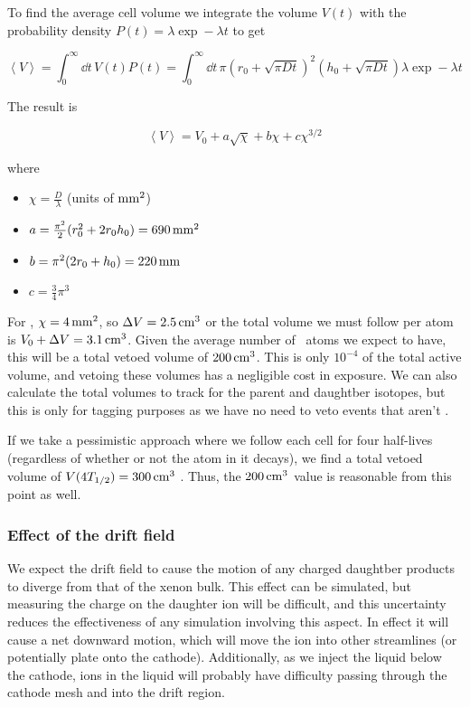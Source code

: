 To find the average cell volume we integrate the volume $V(t)$ with the probability density $P(t) = \lambda \exp -\lambda t$ to get

\begin{equation}
\left< V \right> = \int_0^{\infty} \dd t\,V(t) P(t) = \int_0^{\infty} \dd t\,\pi(r_0 + \sqrt{\pi Dt})^2(h_0 + \sqrt{\pi Dt})\lambda\exp -\lambda t
\end{equation}

The result is

\begin{equation}
\left< V \right> = V_0 + a\sqrt{\chi} + b\chi + c\chi^{3/2}
\end{equation}

where
\begin{itemize}
    \item $\chi = \frac{D}{\lambda}$ (units of $\mathrm{mm^2}$)
    \item $a = \frac{\pi^{2}}{2} (r_0^2+2 r_0 h_0) = 690\,\mathrm{mm^2}$
    \item $b = \pi^2 (2r_0 + h_0) = 220\,\mathrm{mm}$
    \item $c = \frac{3}{4} \pi^{3}$
\end{itemize}

For \Pb, $\chi = 4\,\mathrm{mm^2}$, so $\Delta V = 2.5\,\mathrm{cm^3}$ or the total volume we must follow per atom is $V_0 + \Delta V = 3.1\,\mathrm{cm^3}$. Given the average number of \Pb~atoms we expect to have, this will be a total vetoed volume of $200\,\mathrm{cm^3}$. This is only $10^{-4}$ of the total active volume, and vetoing these volumes has a negligible cost in exposure. We can also calculate the total volumes to track for the parent and daughtber isotopes, but this is only for tagging purposes as we have no need to veto events that aren't \Pb.

If we take a pessimistic approach where we follow each cell for four half-lives (regardless of whether or not the atom in it decays), we find a total vetoed volume of $V(4T_{1/2}) = 300\,\mathrm{cm^3}$ . Thus, the $200\,\mathrm{cm^3}$ value is reasonable from this point as well.

\subsubsection{Effect of the drift field}

We expect the drift field to cause the motion of any charged daughtber products to diverge from that of the xenon bulk. This effect can be simulated, but measuring the charge on the daughter ion will be difficult, and this uncertainty reduces the effectiveness of any simulation involving this aspect. In effect it will cause a net downward motion, which will move the ion into other streamlines (or potentially plate onto the cathode). Additionally, as we inject the liquid below the cathode, ions in the liquid will probably have difficulty passing through the cathode mesh and into the drift region.

